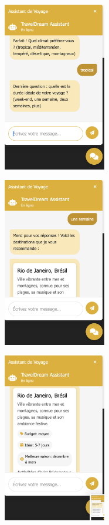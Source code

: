 \documentclass[a4paper,12pt]{article}
\begin{document}
\begin{figure}[H]
    \centering
    \includegraphics[width=0.4\textwidth]{6_chatbot_4.png}
\end{figure}
\begin{figure}[H]
    \centering
    \includegraphics[width=0.4\textwidth]{6_chatbot_5.png}
\end{figure}
\begin{figure}[H]
    \centering
    \includegraphics[width=0.4\textwidth]{6_chatbot_6.png}
\end{figure}
\end{document}
